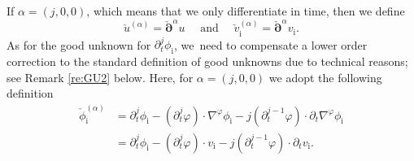 \documentclass[11pt]{article}
\newcommand{\dt}{\partial_t}
\newcommand{\cpalpha}{\check{\bm{\partial}}^{\alpha} }
\theoremstyle{definition}
\begin{document}
If $\alpha=(j,0,0)$, which means that we only differentiate in time, then we define
\[
\check{u}^{(\alpha)} = \cpalpha u
\quad\mbox{ and }\quad
\check{v}_\mathrm{i}^{(\alpha)} = \cpalpha v_\mathrm{i}.
\]
As for the good unknown for $\dt^j\phi_\mathrm{i}$, we~need to compensate a lower order correction to the standard definition of good unknowns due to technical reasons; see Remark \ref{re:GU2} below.
Here, for $\alpha=(j,0,0)$ we adopt the following definition
\begin{align*}
\check{\phi}_\mathrm{i}^{(\alpha)}
&= \dt^j \phi_\mathrm{i}-(\dt^j\varphi)\cdot\nabla^\varphi\phi_\mathrm{i}-j(\dt^{j-1}\varphi)\cdot\dt\nabla^\varphi\phi_\mathrm{i} \\
&= \dt^j \phi_\mathrm{i}-(\dt^j\varphi)\cdot v_\mathrm{i}-j(\dt^{j-1}\varphi)\cdot\dt v_\mathrm{i}.
\end{align*}
\end{document}
